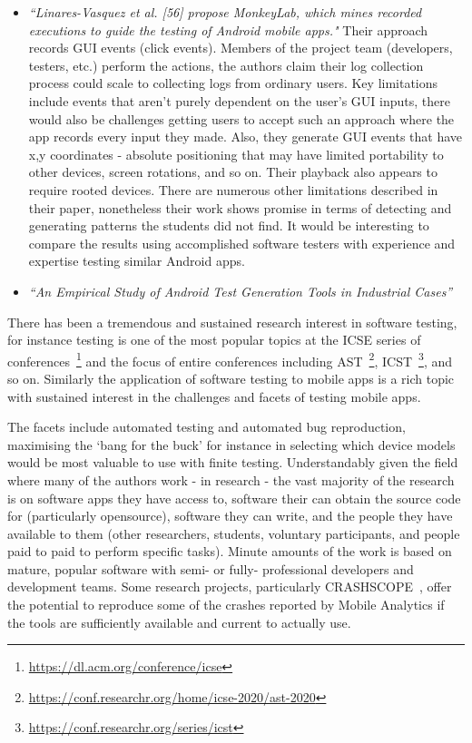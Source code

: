 \begin{itemize}
    \item \emph{``Linares-Vasquez et al. [56] propose MonkeyLab, which mines recorded executions to guide the testing of Android mobile apps."} Their approach records GUI events (click events). Members of the project team (developers, testers, etc.) perform the actions, the authors claim their log collection process could scale to collecting logs from ordinary users. Key limitations include events that aren't purely dependent on the user's GUI inputs, there would also be challenges getting users to accept such an approach where the app records every input they made. Also, they generate GUI events that have x,y coordinates - absolute positioning that may have limited portability to other devices, screen rotations, and so on. Their playback also appears to require rooted devices. There are numerous other limitations described in their paper, nonetheless their work shows promise in terms of detecting and generating patterns the students did not find. It would be interesting to compare the results using accomplished software testers with experience and expertise testing similar Android apps.
    
    \item \emph{``An Empirical Study of Android Test Generation Tools in Industrial Cases''}~\cite{wang2018_an_empirical_study_of_android_test_generation_tools_in_industrial_cases} 
\end{itemize}

There has been a tremendous and sustained research interest in software testing, for instance testing is one of the most popular topics at the ICSE series of conferences~\footnote{\url{https://dl.acm.org/conference/icse}} and the focus of entire conferences including AST~\footnote{\url{https://conf.researchr.org/home/icse-2020/ast-2020}}, ICST~\footnote{\url{https://conf.researchr.org/series/icst}}, and so on. Similarly the application of software testing to mobile apps is a rich topic with sustained interest in the challenges and facets of testing mobile apps.

The facets include automated testing and automated bug reproduction, maximising the `bang for the buck' for instance in selecting which device models would be most valuable to use with finite testing. Understandably given the field where many of the authors work - in research - the vast majority of the research is on software apps they have access to, software their can obtain the source code for (particularly opensource), software they can write, and the people they have available to them (other researchers, students, voluntary participants, and people paid to paid to perform specific tasks). Minute amounts of the work is based on mature, popular software with semi- or fully- professional developers and development teams. Some research projects, particularly CRASHSCOPE~\cite{moran2016_automatically_drr_android_app_crashes}, offer the potential to reproduce some of the crashes reported by Mobile Analytics if the tools are sufficiently available and current to actually use.




